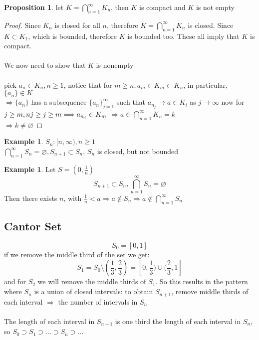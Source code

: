 \documentclass[12pt]{article}
\theoremstyle{plain}
\theoremstyle{definition}
\newtheorem{example}[theorem]{Example}
\newtheorem{proposition}[theorem]{Proposition}
\begin{document}
\begin{proposition}
	let $K = \bigcap^\infty_{n=1} K_n$, then $K$ is compact and $K$ is not empty
\end{proposition}

\begin{proof}
	Since $K_n$ is closed for all $n$, therefore $K = \bigcap^\infty_{n=1} K_n$ is closed. Since $K \subset K_1$, which is bounded, therefore $K$ is bounded too. These all imply that $K$ is compact.\\
	\\
	We now need to show that $K$ is nonempty\\
	\\
	pick $a_n \in K_n, n \geq 1$, notice that for $m \geq n, a_m \in K_m \subset K_n$, in particular, $\{ a_n \} \in K$\\
	$\Longrightarrow \{ a_n \} $ has a subsequence $\{ a_n \}^\infty_{j=1} $ such that $a_{n_j} \to a \in K_i$ as $j\to\infty$ now for $j \geq m, nj \geq j \geq m\\ \Longrightarrow a_{n_j} \in K_m $
	$\Longrightarrow a \in \bigcap^\infty_{n=1} K_n = k$\\
	$\Longrightarrow  k \neq \varnothing$
\end{proof}

\begin{example}
	$S_n : [n, \infty), n\geq 1$\\
	$\bigcap^\infty_{n=1} S_n = \varnothing, S_{n+1} \subset S_n$, $S_n$ is closed, but not bounded
\end{example}

\begin{example}
	Let $S = (0, \frac{1}{n})$
	$$S_{n+1} \subset S_n, \bigcap^\infty_{n=1} S_n = \varnothing$$
	Then there exists $n$, with $\frac{1}{n} < a \Longrightarrow a \not\in S_n \Longrightarrow a \not\in \bigcap^\infty_{n=1} S_n$
\end{example}

\subsection{Cantor Set}

$$S_0 = [0,1]$$
if we remove the middle third of the set we get:
$$S_1 = S_0 \setminus (\frac{1}{3}, \frac{2}{3}) = [0,\frac{1}{3}) \cup (\frac{2}{3}, 1]$$ 
and for $S_2$ we will remove the middle thirds of $S_1$. So this results in the pattern where $S_n$ is a union of closed intervals: to obtain $S_{n+1}$, remove middle thirds of each interval $\Longrightarrow$ the number of intervals in $S_n$\\
\\
The length of each interval in $S_{n+1} $ is one third the length of each interval in $S_n$, so
$S_0 \supset S_1\supset ... \supset S_n \supset...$
\end{document}
